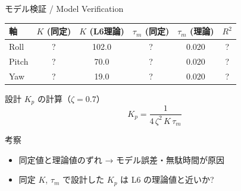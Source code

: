 \documentclass[aspectratio=169, 14pt]{beamer}
\begin{document}
\begin{frame}{モデル検証 / Model Verification}
  \vspace{-0.3em}

  {\small
  \begin{table}
    \centering
    \begin{tabular}{lccccc}
      \hline
      \textbf{軸} & \textbf{$K$ (同定)} & \textbf{$K$ (L6理論)} & \textbf{$\tau_m$ (同定)} & \textbf{$\tau_m$ (理論)} & \textbf{$R^2$} \\
      \hline
      Roll  & ? & 102.0 & ? & 0.020 & ? \\
      Pitch & ? &  70.0 & ? & 0.020 & ? \\
      Yaw   & ? &  19.0 & ? & 0.020 & ? \\
      \hline
    \end{tabular}
  \end{table}
  }

  \vspace{0.2em}

  \begin{block}{設計 $K_p$ の計算（$\zeta = 0.7$）}
    \vspace{-0.5em}
    \[
      K_p = \frac{1}{4\,\zeta^2\,K\,\tau_m}
    \]
    \vspace{-1em}
  \end{block}

  \vspace{0.2em}

  \begin{exampleblock}{考察}
    {\footnotesize
    \begin{itemize}\setlength{\itemsep}{0pt}
      \item 同定値と理論値のずれ → モデル誤差・無駄時間が原因
      \item 同定 $K$, $\tau_m$ で設計した $K_p$ は L6 の理論値と近いか?
    \end{itemize}
    }
  \end{exampleblock}
\end{frame}
\end{document}
